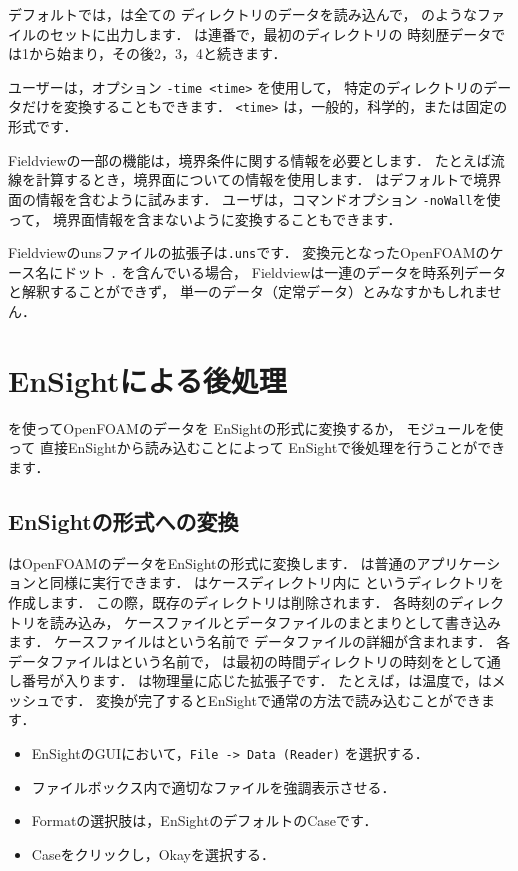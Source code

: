 デフォルトでは，は全ての
ディレクトリのデータを読み込んで，
のようなファイルのセットに出力します．
は連番で，最初のディレクトリの
時刻歴データでは1から始まり，その後2，3，4と続きます．

ユーザーは，オプション \verb|-time <time>| を使用して，
特定のディレクトリのデータだけを変換することもできます．
\verb|<time>| は，一般的，科学的，または固定の形式です．

Fieldviewの一部の機能は，境界条件に関する情報を必要とします．
たとえば流線を計算するとき，境界面についての情報を使用します．
はデフォルトで境界面の情報を含むように試みます．
ユーザは，コマンドオプション \verb|-noWall|を使って，
境界面情報を含まないように変換することもできます．

Fieldviewのunsファイルの拡張子は\texttt{.uns}です．
変換元となったOpenFOAMのケース名にドット \texttt{.} を含んでいる場合，
Fieldviewは一連のデータを時系列データと解釈することができず，
単一のデータ（定常データ）とみなすかもしれません．



\section{EnSightによる後処理}
\label{sec:6.4}
を使ってOpenFOAMのデータを
EnSightの形式に変換するか，
モジュールを使って
直接EnSightから読み込むことによって
EnSightで後処理を行うことができます．


\subsection{EnSightの形式への変換}
\label{ssec:6.4.1}
はOpenFOAMのデータをEnSightの形式に変換します．
は普通のアプリケーションと同様に実行できます．
はケースディレクトリ内に
というディレクトリを作成します．
この際，既存のディレクトリは削除されます．
各時刻のディレクトリを読み込み，
ケースファイルとデータファイルのまとまりとして書き込みます．
ケースファイルはという名前で
データファイルの詳細が含まれます．
各データファイルはという名前で，
は最初の時間ディレクトリの時刻をとして通し番号が入ります．
は物理量に応じた拡張子です．
たとえば，は温度で，はメッシュです．
変換が完了するとEnSightで通常の方法で読み込むことができます．
\begin{itemize}
 \item EnSightのGUIにおいて，\texttt{File -> Data (Reader)} を選択する．
 \item ファイルボックス内で適切なファイルを強調表示させる．
 \item Formatの選択肢は，EnSightのデフォルトのCaseです．
 \item Caseをクリックし，Okayを選択する．
\end{itemize}


